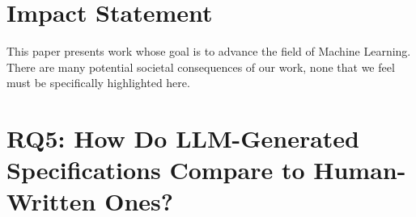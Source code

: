 \documentclass{article}
\theoremstyle{plain}
\theoremstyle{definition}
\theoremstyle{remark}
\begin{document}
\section*{Impact Statement}


This paper presents work whose goal is to advance the field of Machine
Learning. There are many potential societal consequences of our work, none
that we feel must be specifically highlighted here.






\newpage
\appendix
\onecolumn




\section{RQ5: How Do LLM-Generated Specifications Compare to Human-Written Ones?}
\label{appendix:human-llm}






\end{document}
